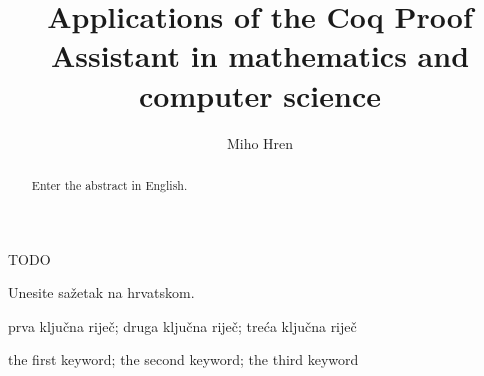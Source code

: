 \documentclass[diplomskirad, upload]{fer}
\title{Applications of the Coq Proof Assistant in mathematics and computer science}
\author{Miho Hren}
\begin{document}
\maketitle
{}

\begin{zahvale}
  TODO
\end{zahvale}

\mainmatter{}

\tableofcontents









\begin{sazetak}
  Unesite sažetak na hrvatskom.
\end{sazetak}

\begin{kljucnerijeci}
  prva ključna riječ; druga ključna riječ; treća ključna riječ
\end{kljucnerijeci}

\begin{abstract}
  Enter the abstract in English.
\end{abstract}

\begin{keywords}
  the first keyword; the second keyword; the third keyword
\end{keywords}


\backmatter{}
\end{document}
